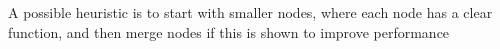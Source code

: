 \documentclass[11pt, reqno]{amsart}
\theoremstyle{definition}
\theoremstyle{remark}
\begin{document}
  A possible heuristic is to start with smaller nodes, where each node has a
  clear function, and then merge nodes if this is shown to improve performance

\end{document}
